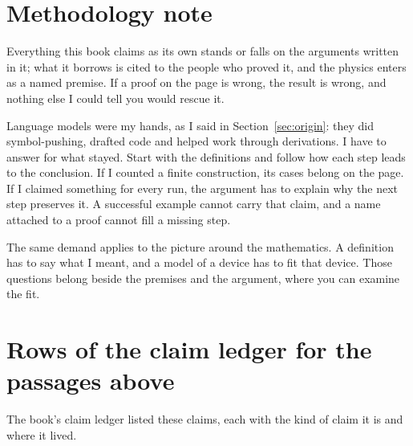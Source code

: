 \documentclass[11pt,twoside]{article}
\theoremstyle{thielethm}
\theoremstyle{thieledef}
\theoremstyle{thieledef}
\theoremstyle{thieledef}
\theoremstyle{thielethm}
\theoremstyle{thieleobs}
\theoremstyle{thielethm}
\begin{document}
\section{Methodology note}
\label{sec:methodology}

Everything this book claims as its own stands or falls on the arguments written in it; what it
borrows is cited to the people who proved it, and the physics enters as a named premise. If a
proof on the page is wrong, the result is wrong, and nothing else I could tell you would rescue it.

Language models were my hands, as I said in Section~\ref{sec:origin}: they did
symbol-pushing, drafted code and helped work through derivations. I have to answer for
what stayed. Start with the definitions and follow how each step leads to the conclusion.
If I counted a finite construction, its cases belong on the page. If I claimed something
for every run, the argument has to explain why the next step preserves it. A successful
example cannot carry that claim, and a name attached to a proof cannot fill a missing step.

The same demand applies to the picture around the mathematics. A definition has to say
what I meant, and a model of a device has to fit that device. Those questions belong beside the premises and the argument, where you can examine the fit.


\section{Rows of the claim ledger for the passages above}

The book's claim ledger listed these claims, each with the kind of claim it is and where it lived.
\end{document}
